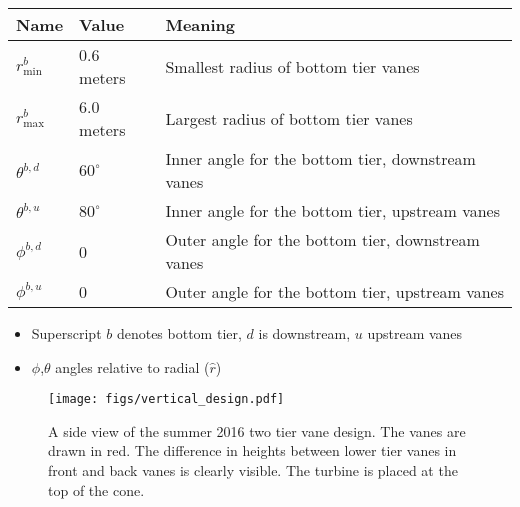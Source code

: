 \begin{table}[]
\centering
\begin{tabular}{lll}
Name                        & Value & Meaning                    \\
 \hline
$r^b_{\text{min}}$          &  0.6 meters & Smallest radius of bottom tier vanes \\
$r^b_{\text{max}}$          &  6.0 meters & Largest radius of bottom tier vanes \\
$\theta^{b,d}$ &  $60^{\circ}$   & Inner angle for the bottom tier, downstream vanes \\
$\theta^{b,u}$ &  $80^{\circ}$   & Inner angle for the bottom tier, upstream vanes \\
$\phi^{b,d}$ &   0   & Outer angle for the bottom  tier, downstream vanes \\
$\phi^{b,u}$ &   0   & Outer angle for the bottom tier, upstream vanes \\
\end{tabular}
\end{table}

\begin{itemize}
 \item Superscript $b$ denotes bottom tier, $d$ is downstream, $u$ upstream vanes
 \item $\phi$,$\theta$ angles relative to radial ($\hat r$)
\end{itemize}


\begin{figure}[!htb]
  \begin{center}
   \texttt{[image: figs/vertical\_design.pdf]}
   \caption{A side view of the summer 2016 two tier vane design. The
     vanes are drawn in red. The difference in heights between lower
     tier vanes in front and back vanes is clearly visible. The turbine
     is placed at the top of the cone.}
   \label{fig:vertical_design}
  \end{center}
 \end{figure}

